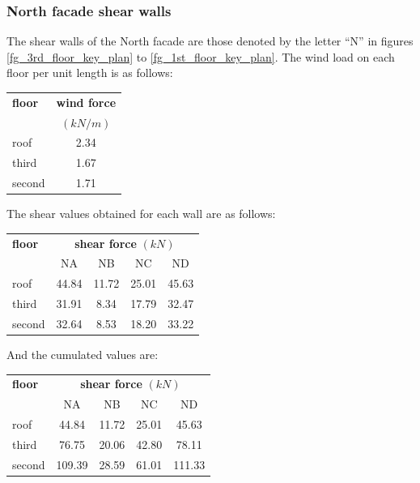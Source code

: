 \subsubsection{North facade shear walls}
The shear walls of the North facade are those denoted by the letter ``N'' in figures \ref{fg_3rd_floor_key_plan} to \ref{fg_1st_floor_key_plan}. The wind load on each floor per unit length is as follows:


\begin{center}
  \begin{tabular}{|l|c|}
    \hline
    \textbf{floor} & \textbf{wind force}\\
    & $(kN/m)$\\
    \hline
    roof & 2.34 \\
    third & 1.67 \\
    second & 1.71 \\
    \hline
  \end{tabular}
\end{center}

\noindent The shear values obtained for each wall are as follows:

\begin{center}
  \begin{tabular}{|l|c|c|c|c|}
    \hline
    \textbf{floor} & \multicolumn{4}{|c|}{\textbf{shear force} $(kN)$}\\
                   & NA & NB & NC & ND \\
    \hline
    roof & 44.84 & 11.72 & 25.01 & 45.63 \\
    third & 31.91 & 8.34 & 17.79 & 32.47 \\
    second & 32.64 & 8.53 & 18.20 & 33.22 \\
    \hline
  \end{tabular}
\end{center}  

\noindent And the cumulated values are:

\begin{center}
  \begin{tabular}{|l|c|c|c|c|}
    \hline
    \textbf{floor} & \multicolumn{4}{|c|}{\textbf{shear force} $(kN)$}\\
                   & NA & NB & NC & ND \\
    \hline
    roof & 44.84 & 11.72 & 25.01 & 45.63 \\
    third & 76.75 & 20.06 & 42.80 & 78.11 \\
    second & 109.39 & 28.59 & 61.01 & 111.33 \\
    \hline
  \end{tabular}
\end{center}  

